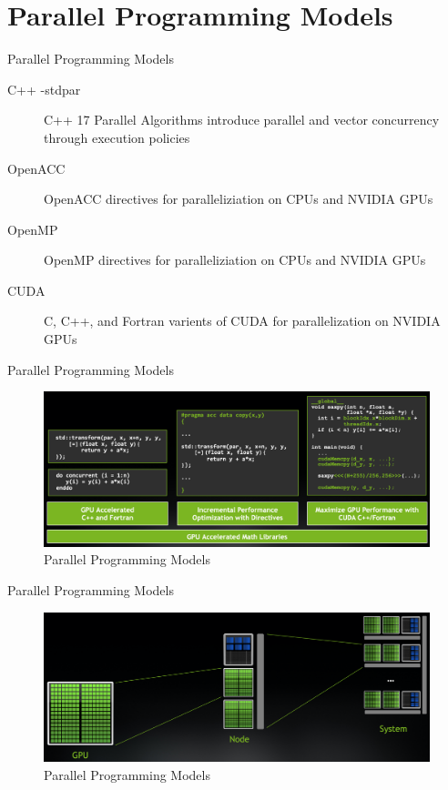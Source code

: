 \documentclass[aspectratio=169]{beamer}
\begin{document}
\section{Parallel Programming Models}

\begin{frame}{Parallel Programming Models}
\begin{description}
  \item[C++ -stdpar] C++ 17 Parallel Algorithms introduce parallel and vector concurrency through execution policies
  \item[OpenACC] OpenACC directives for paralleliziation on CPUs and NVIDIA GPUs
  \item[OpenMP] OpenMP directives for paralleliziation on CPUs and NVIDIA GPUs
  \item[CUDA] C, C++, and Fortran varients of CUDA for parallelization on NVIDIA GPUs
\end{description}
\end{frame}

\begin{frame}{Parallel Programming Models}
\begin{figure}
  \includegraphics[width=\linewidth]{figures/use_gpu.png}
  \caption{Parallel Programming Models}
\end{figure}
\end{frame}

\begin{frame}{Parallel Programming Models}
\begin{figure}
  \includegraphics[width=\linewidth]{figures/parallel.png}
  \caption{Parallel Programming Models}
\end{figure}
\end{frame}
\end{document}
